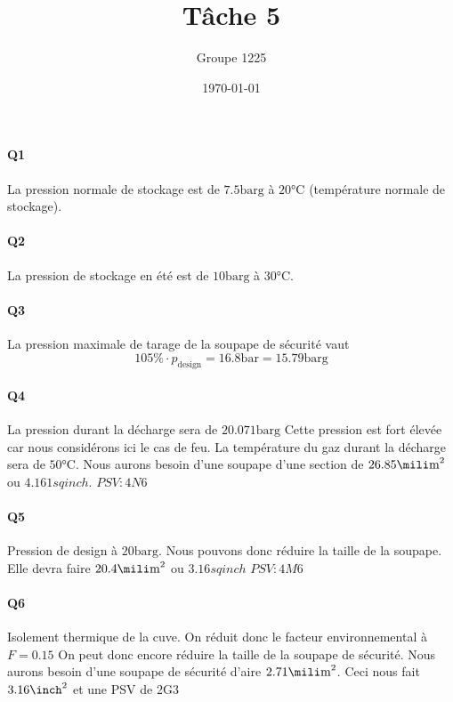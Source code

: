 \documentclass[a4paper,oneside,12pt]{article}
\title{T\^ache 5}
\author{Groupe 1225}
\date{\today}
\newcommand{\barg}{\si{\bar}\text{g}}
\begin{document}
\maketitle

\paragraph{Q1} La pression normale de stockage est de $7.5 \barg$ à $20\si{\celsius}$ 
(température normale de stockage).

\paragraph{Q2} La pression de stockage en été est de $10 \barg$ à $30\si{\celsius}$.

\paragraph{Q3} La pression maximale de tarage de la soupape de sécurité vaut 
\[ 105\% \cdot p_{\text{design}} = 16.8\si{\bar} = 15.79\barg \]

\paragraph{Q4} 
La pression durant la décharge sera de $20.071 \barg$ Cette pression est fort élevée car nous considérons ici le cas de feu. 
La température du gaz durant la décharge sera de $50\si{\celsius}$. Nous aurons besoin d'une soupape d'une section de
$26.85\si{\mili\meter\squared}$ ou $4.161 sqinch$. $PSV : 4N6$
\paragraph{Q5} 
  Pression de design à $20\barg$. Nous pouvons donc réduire la taille de la soupape. Elle devra faire $20.4\si{\mili\meter\squared}$ ou 
  $3.16 sqinch$ $PSV : 4M6$
\paragraph{Q6}
  Isolement thermique de la cuve. On réduit donc le facteur environnemental à $F = 0.15$
  On peut donc encore réduire la taille de la soupape de sécurité. Nous aurons besoin d'une soupape de 
  sécurité d'aire $2.71\si{\mili\meter\squared}$. Ceci nous fait $3.16 \si{\inch\squared}$ et une PSV de 2G3
\end{document}
